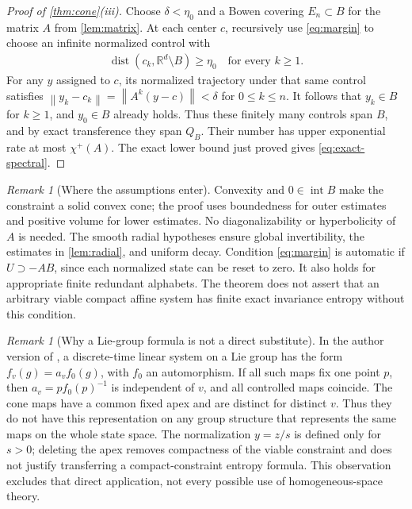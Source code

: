 \documentclass[11pt,a4paper]{article}
\theoremstyle{definition}
\theoremstyle{remark}
\newtheorem{remark}[theorem]{Remark}
\begin{document}
\begin{proof}[Proof of \cref{thm:cone}(iii)]
Choose \(\delta<\eta_0\) and a Bowen covering \(E_n\subset B\) for the matrix \(A\) from \cref{lem:matrix}. At each center \(c\), recursively use \eqref{eq:margin} to choose an infinite normalized control with
\begin{align*}
 \operatorname{dist}(c_k,\mathbb R^d\setminus B)\geq\eta_0
       \quad\text{for every }k\geq1.
\end{align*}
For any \(y\) assigned to \(c\), its normalized trajectory under that same control satisfies
\(\left\lVert y_k-c_k\right\rVert=\left\lVert A^k(y-c)\right\rVert<\delta\) for \(0\leq k\leq n\).
It follows that \(y_k\in B\) for \(k\geq1\), and \(y_0\in B\) already holds. Thus these finitely many controls span \(B\), and by exact transference they span \(Q_B\). Their number has upper exponential rate at most \(\chi^+(A)\). The exact lower bound just proved gives \eqref{eq:exact-spectral}.
\end{proof}

\begin{remark}[Where the assumptions enter]\label{rem:assumptions}
Convexity and \(0\in\operatorname{int} B\) make the constraint a solid convex cone; the proof uses boundedness for outer estimates and positive volume for lower estimates. No diagonalizability or hyperbolicity of \(A\) is needed. The smooth radial hypotheses ensure global invertibility, the estimates in \cref{lem:radial}, and uniform decay. Condition \eqref{eq:margin} is automatic if \(U\supset -AB\), since each normalized state can be reset to zero. It also holds for appropriate finite redundant alphabets. The theorem does not assert that an arbitrary viable compact affine system has finite exact invariance entropy without this condition.
\end{remark}

\begin{remark}[Why a Lie-group formula is not a direct substitute]\label{rem:lie}
In the author version of \cite[Definition 1]{CCS2021}, a discrete-time linear system on a Lie group has the form \(f_v(g)=a_v f_0(g)\), with \(f_0\) an automorphism. If all such maps fix one point \(p\), then \(a_v=p f_0(p)^{-1}\) is independent of \(v\), and all controlled maps coincide. The cone maps have a common fixed apex and are distinct for distinct \(v\). Thus they do not have this representation on any group structure that represents the same maps on the whole state space. The normalization \(y=z/s\) is defined only for \(s>0\); deleting the apex removes compactness of the viable constraint and does not justify transferring a compact-constraint entropy formula. This observation excludes that direct application, not every possible use of homogeneous-space theory.
\end{remark}
\end{document}
